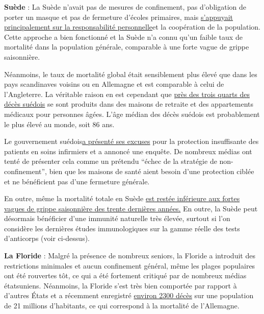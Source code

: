 \textbf{Suède} : La Suède n'avait pas de mesures de confinement, pas
d'obligation de porter un masque et pas de fermeture d'écoles primaires,
mais
\href{https://www.nationalreview.com/2020/05/coronavirus-crisis-sweden-refused-lockdown-other-countries-following/}{s'appuyait
principalement sur la responsabilité personnelle}et la coopération de la
population. Cette approche a bien fonctionné et la Suède n'a connu qu'un
faible taux de mortalité dans la population générale, comparable à une
forte vague de grippe saisonnière.

Néanmoins, le taux de mortalité global était sensiblement plus élevé que
dans les pays scandinaves voisins ou en Allemagne et est comparable à
celui de l'Angleterre. La véritable raison en est cependant que
\href{https://www.thelocal.se/20200525/swedish-death-toll-passes-4000-as-coronavirus-cases-in-care-homes-start-to-fall}{près
des trois quarts des décès suédois} se sont produits dans des maisons de
retraite et des appartements médicaux pour personnes âgées. L'âge médian
des décès suédois est probablement le plus élevé au monde, soit 86 ans.

Le gouvernement
suédois\href{https://www.msn.com/en-au/news/coronavirus/sweden-admits-failure-to-protect-elderly-in-care-homes/ar-BB13RMao}{a
présenté ses excuses} pour la protection insuffisante des patients en
soins infirmiers et a annoncé une enquête. De nombreux médias ont tenté
de présenter cela comme un prétendu ``échec de la stratégie de
non-confinement'', bien que les maisons de santé aient besoin d'une
protection ciblée et ne bénéficient pas d'une fermeture générale.

En outre, même la mortalité totale en Suède
\href{https://www.reuters.com/article/us-health-coronavirus-sweden-toll/coronavirus-pushes-swedish-deaths-to-highest-since-1993-in-april-idUSKBN22U1S4}{est
restée inférieure aux fortes vagues de grippe saisonnière des trente
dernières années.} En outre, la Suède peut désormais bénéficier d'une
immunité naturelle très élevée, surtout si l'on considère les dernières
études immunologiques sur la gamme réelle des tests d'anticorps (voir
ci-dessus).

\textbf{La Floride} : Malgré la présence de nombreux seniors, la Floride
a introduit des restrictions minimales et aucun confinement général,
même les plages populaires ont été rouvertes tôt, ce qui a été fortement
critiqué par de nombreux médias étatsuniens. Néanmoins, la Floride s'est
très bien comportée par rapport à d'autres États et a récemment
enregistré
\href{https://www.clickorlando.com/news/local/2020/03/16/interactive-map-shows-florida-coronavirus-cases-in-real-time/}{environ
2300 décès} sur une population de 21 millions d'habitants, ce qui
correspond à la mortalité de l'Allemagne.

